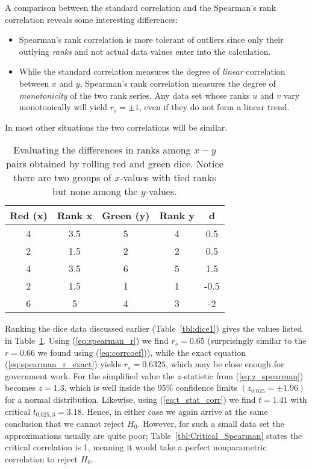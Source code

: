 A comparison between the standard correlation and the Spearman's rank correlation reveals some interesting differences:
\begin{itemize}
	\item Spearman's rank correlation is more tolerant of outliers since only their outlying \emph{ranks} and not actual
	data values enter into the calculation.
	\item While the standard correlation measures the degree of \emph{linear} correlation between $x$ and $y$,
		Spearman's rank correlation measures the degree of \emph{monotonicity} of the two rank series.  Any data set whose ranks
		$u$ and $v$ vary monotonically will yield $r_s = \pm 1$, even if they do not form a linear trend.
\end{itemize}
In most other situations the two correlations will be similar.
\begin{table}[H]
\centering
\begin{tabular}{|c|c|c|c|c|} \hline
\bf{Red} (x) & \bf{Rank} x & \bf{Green} (y) & \bf{Rank} y & \bf{d} \\ \hline
4 & 3.5 & 5 & 4 & 0.5 \\ \hline
2 & 1.5 & 2 & 2 & 0.5 \\ \hline
4 & 3.5 & 6 & 5 & 1.5 \\ \hline
2 & 1.5 & 1 & 1 & -0.5 \\ \hline
6 & 5    & 4 & 3 & -2 \\ \hline
\end{tabular}
\caption{Evaluating the differences in ranks among $x-y$ pairs obtained by rolling red and green dice.
Notice there are two groups of $x$-values with tied ranks but none among the $y$-values.}
\label{tbl:dice2}
\end{table}

Ranking the dice data discussed earlier (Table~\ref{tbl:dice1}) gives the values
listed in Table~\ref{tbl:dice2}.
Using (\ref{eq:spearman_r}) we find $r_s = 0.65$ (surprisingly similar to the $r = 0.66$ we found using (\ref{eq:corrcoef})),
while the exact equation (\ref{eq:spearman_r_exact}) yields $r_s = 0.6325$, which may be close enough for government work.
For the simplified value the $z$-statistic from (\ref{eq:z_spearman}) becomes $z = 1.3$, which is well inside the 95\% confidence limits
$(z_{0.025} = \pm 1.96)$ for a normal distribution.  Likewise, using (\ref{eq:t_stat_corr}) we find $t = 1.41$ with critical
$t_{0.025,3} = 3.18$.  Hence, in either case we again arrive at the same conclusion
that we cannot reject $H_0$.  However, for such a small data set the approximations usually are quite poor;
Table~\ref{tbl:Critical_Spearman} states the critical correlation is 1, meaning it would take a perfect nonparametric correlation to reject $H_0$.

